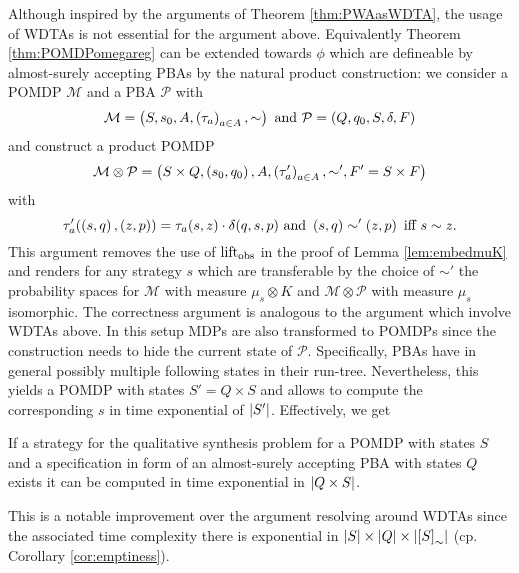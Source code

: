 Although inspired by the arguments of Theorem \ref{thm:PWAasWDTA}, the usage 
of \acp{WDTA} is not essential for the argument above. Equivalently Theorem
\ref{thm:POMDPomegareg} can be extended towards $\phi$ which
are defineable by almost-surely accepting \acp{PBA} by the natural product
construction: we consider a \ac{POMDP} $\mathcal{M}$ and a \ac{PBA}
$\mathcal{P}$ with
\begin{equation*}
  \mathcal{M} = \left(S, s_{0}, A, \left(\tau_{a}\right)_{a\in A}, \sim\right)
  \text{ and }
  \mathcal{P} = \left(Q, q_{0}, S, \delta, F\right)
\end{equation*}
and construct a product \ac{POMDP}
\begin{equation*}
  \mathcal{M}\otimes\mathcal{P} = \left(S\times Q, \left(s_{0}, q_{0}\right), A,
    \left(\tau'_{a}\right)_{a\in A}, \sim', F' = S\times F\right)
\end{equation*}
with
\begin{equation*}
  \tau'_{a}(\left(s, q\right), \left(z, p\right)) = \tau_{a}(s, z)\cdot\delta(q, s, p)
  \text{ and }
  \left(s, q\right)\sim'\left(z, p\right)\text{ iff }s\sim z.
\end{equation*}
This argument removes the use of $\operatorname{lift}_{\operatorname{obs}}$ in the proof of Lemma
\ref{lem:embedmuK} and renders for any strategy $s$ which are transferable by
the choice of $\sim'$ the probability spaces for $\mathcal{M}$ with measure
$\mu_{s}\otimes K$ and $\mathcal{M}\otimes\mathcal{P}$ with measure $\mu_{s}$
isomorphic. The correctness argument is analogous to the argument which involve
\acp{WDTA} above. In this setup \acp{MDP} are also transformed to \acp{POMDP}
since the construction needs to hide the current state of $\mathcal{P}$.
Specifically, \acp{PBA} have in general possibly multiple following states in
their run-tree. Nevertheless, this yields a \ac{POMDP} with
states $S' = Q\times S$ and allows to compute the corresponding $s$ in
time exponential of $\left\vert{S'}\right\vert$. Effectively, we get
\begin{corollary}
  If a strategy for the qualitative synthesis problem for a \ac{POMDP} with
  states $S$ and a specification in form of an almost-surely accepting \ac{PBA} 
  with states $Q$ exists it can be computed in time exponential in 
  $\left\vert{Q\times S}\right\vert$.
\end{corollary}
This is a notable improvement over the argument resolving around \acp{WDTA}
since the associated time complexity there is exponential in
$\left\vert{S}\right\vert\times\left\vert{Q}\right\vert\times\left\vert{\left[S\right]_{\sim}}\right\vert$ (cp. Corollary 
\ref{cor:emptiness}).
